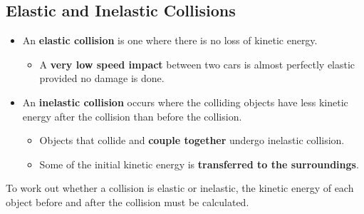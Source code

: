 \subsection{Elastic and Inelastic Collisions}

\begin{itemize}
    \item An \textbf{elastic collision} is one where there is no loss of kinetic energy.
        \begin{itemize}
            \item A \textbf{very low speed impact} between two cars is almost perfectly elastic provided no damage is done.
        \end{itemize}
    \item An \textbf{inelastic collision} occurs where the colliding objects have less kinetic energy after the collision than before the collision.
        \begin{itemize}
            \item Objects that collide and \textbf{couple together} undergo inelastic collision.
            \item Some of the initial kinetic energy is \textbf{transferred to the surroundings}.
        \end{itemize}
\end{itemize}

To work out whether a collision is elastic or inelastic, the kinetic energy of each object before and after the collision must be calculated.
